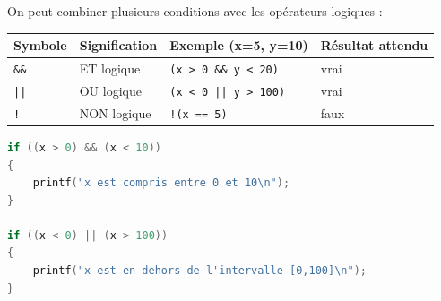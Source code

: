 On peut combiner plusieurs conditions avec les opérateurs logiques :

\begin{center}
	\begin{tabular}{|l|l|l|l|}
		\hline
		Symbole                                         & Signification & Exemple (x=5, y=10)                                            & Résultat attendu \\
		\hline
		\texttt{\&\&} & ET logique & \texttt{(x > 0 \&\& y < 20)}  & vrai \\
		\texttt{||}   & OU logique & \texttt{(x < 0 || y > 100)}   & vrai \\
		\texttt{!}    & NON logique & \texttt{!(x == 5)}             & faux \\
		\hline
	\end{tabular}
\end{center}
\begin{lstlisting}[language=c]
if ((x > 0) && (x < 10))
{
    printf("x est compris entre 0 et 10\n");
}

if ((x < 0) || (x > 100))
{
    printf("x est en dehors de l'intervalle [0,100]\n");
}
\end{lstlisting}

